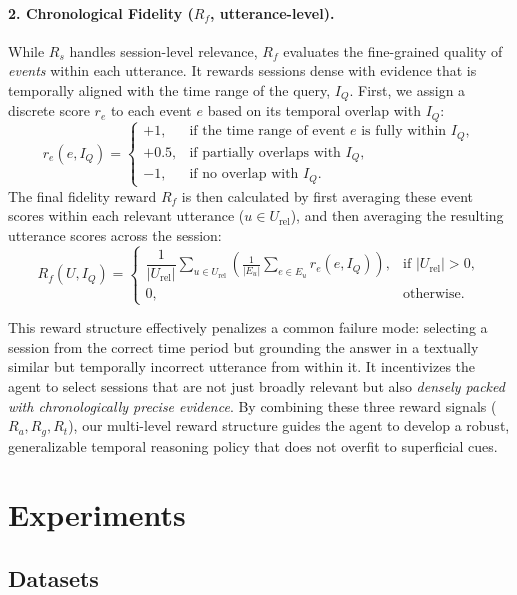 \documentclass{article} %
\begin{document}
\paragraph{\textbf{2. Chronological Fidelity ($R_f$, utterance-level).}}
While $R_s$ handles session-level relevance, $R_f$ evaluates the fine-grained quality of \emph{events} within each utterance. It rewards sessions dense with evidence that is temporally aligned with the time range of the query, $I_Q$.
First, we assign a discrete score $r_e$ to each event $e$ based on its temporal overlap with $I_Q$:
\begin{equation}
r_e(e, I_Q) =
\begin{cases}
+1, & \text{if the time range of event $e$ is fully within } I_Q,\\
+0.5, & \text{if partially overlaps with } I_Q,\\
-1, & \text{if no overlap with } I_Q.
\end{cases}
\end{equation}
The final fidelity reward $R_f$ is then calculated by first averaging these event scores within each relevant utterance ($u \in U_{\text{rel}}$), and then averaging the resulting utterance scores across the session:
\begin{equation}
R_f(U, I_Q) =
\begin{cases}
\dfrac{1}{|U_{\text{rel}}|} \displaystyle\sum_{u \in U_{\text{rel}}} \left( \frac{1}{|E_u|} \sum_{e \in E_u} r_e(e, I_Q) \right), & \text{if } |U_{\text{rel}}| > 0, \\[10pt]
0, & \text{otherwise.}
\end{cases}
\end{equation}

This reward structure effectively penalizes a common failure mode: selecting a session from the correct time period but grounding the answer in a textually similar but temporally incorrect utterance from within it. It incentivizes the agent to select sessions that are not just broadly relevant but also \emph{densely packed with chronologically precise evidence}. By combining these three reward signals ($R_a, R_g, R_t$), our multi-level reward structure guides the agent to develop a robust, generalizable temporal reasoning policy that does not overfit to superficial cues.

\section{Experiments}
\subsection{Datasets}
\end{document}

